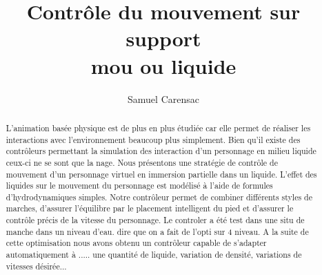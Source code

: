 \documentclass[runningheads,a4paper]{llncs}
\begin{document}
\mainmatter  %

\title{Contrôle du mouvement sur support\\ mou ou liquide}


%
%
\author{Samuel Carensac}
%


%
%

\maketitle


\begin{abstract}
 L'animation basée physique est de plus en plus étudiée car elle permet de réaliser les interactions avec l'environnement beaucoup plus simplement. Bien qu'il existe des contrôleurs permettant la simulation des interaction d'un personnage en milieu liquide ceux-ci ne se sont que la nage. Nous présentons une stratégie de contrôle de mouvement d'un personnage virtuel en immersion partielle dans un liquide. L'effet des liquides sur le mouvement du personnage est modélisé à l'aide de formules d'hydrodynamiques simples. Notre contrôleur permet de combiner différents styles de marches, d'assurer l'équilibre par le placement intelligent du pied et d'assurer le contrôle précis de la vitesse du personnage. Le controler a été test dans une situ de manche dans un niveau d'eau. dire que on a  fait de l'opti sur 4 niveau. 
A la suite de cette optimisation nous avons obtenu un contrôleur capable de s'adapter automatiquement à ..... une quantité de liquide, variation de densité, variations de vitesses désirée...
\end{abstract}
\end{document}
